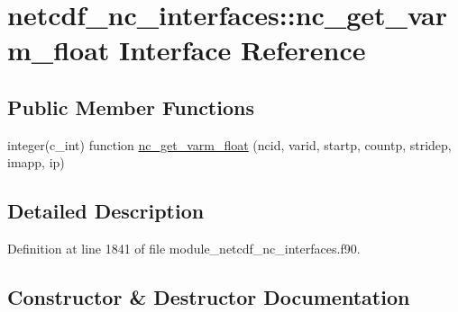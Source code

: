 \hypertarget{interfacenetcdf__nc__interfaces_1_1nc__get__varm__float}{}\section{netcdf\+\_\+nc\+\_\+interfaces\+:\+:nc\+\_\+get\+\_\+varm\+\_\+float Interface Reference}
\label{interfacenetcdf__nc__interfaces_1_1nc__get__varm__float}
\subsection*{Public Member Functions}
\begin{DoxyCompactItemize}
\item 
integer(c\+\_\+int) function \hyperlink{interfacenetcdf__nc__interfaces_1_1nc__get__varm__float_a3532ec20e9455873c2b6d0f585c6523e}{nc\+\_\+get\+\_\+varm\+\_\+float} (ncid, varid, startp, countp, stridep, imapp, ip)
\end{DoxyCompactItemize}


\subsection{Detailed Description}


Definition at line 1841 of file module\+\_\+netcdf\+\_\+nc\+\_\+interfaces.\+f90.



\subsection{Constructor \& Destructor Documentation}
\mbox{\label{interfacenetcdf__nc__interfaces_1_1nc__get__varm__float_a3532ec20e9455873c2b6d0f585c6523e}} 
